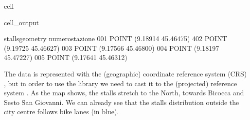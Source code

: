 \documentclass[letterpaper,10pt,english]{jupyterBook}
\begin{document}
\begin{sphinxuseclass}{cell}
\begin{sphinxuseclass}{cell_output}
\begin{sphinxVerbatim}[commandchars=\\\{\}]
                          stalls\PYGZus{}geometry  
numero\PYGZus{}stazione                            
001              POINT (9.18914 45.46475)  
402              POINT (9.19725 45.46627)  
003              POINT (9.17566 45.46800)  
004              POINT (9.18197 45.47227)  
005              POINT (9.17641 45.46312)  
\end{sphinxVerbatim}

\end{sphinxuseclass}
\end{sphinxuseclass}
\sphinxAtStartPar
The data is represented with the (geographic) coordinate reference system (CRS) , but in order to use the  library we need to cast it to the (projected) reference system . As the map shows, the stalls stretch to the North, towards Bicocca and Sesto San Giovanni. We can already see that the stalls distribution outside the city centre follows bike lanes (in blue).
\end{document}
